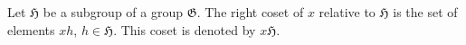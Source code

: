 Let $\mathfrak{H}$ be a subgroup of a group $\mathfrak{G}$. The right coset of $x$ relative to $\mathfrak{H}$ is the set of elements $xh$, $h \in \mathfrak{H}$. This coset is denoted by $x\mathfrak{H}$.
